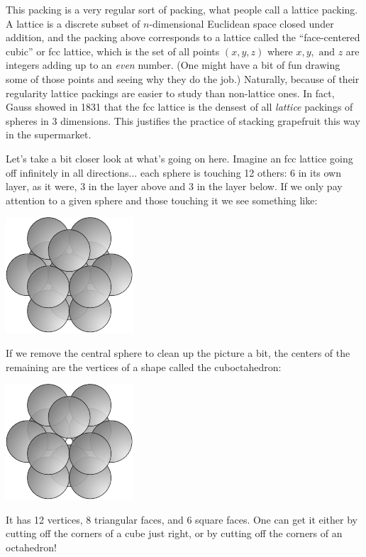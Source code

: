 This packing is a very regular sort of packing, what people call a lattice packing. A lattice is a discrete subset of $n$-dimensional Euclidean space closed under addition, and the packing above corresponds to a lattice called the ``face-centered cubic'' or fcc lattice, which is the set of all points $(x,y,z)$ where $x, y,\text{ and }z$ are integers adding up to an \emph{even} number. (One might have a bit of fun drawing some of those points and seeing why they do the job.) Naturally, because of their regularity lattice packings are easier to study than non-lattice ones. In fact, Gauss showed in 1831 that the fcc lattice is the densest of all \emph{lattice} packings of spheres in 3 dimensions. This justifies the practice of stacking grapefruit this way in the supermarket.

Let's take a bit closer look at what's going on here. Imagine an fcc lattice going off infinitely in all directions... each sphere is touching 12 others: 6 in its own layer, as it were, 3 in the layer above and 3 in the layer below. If we only pay attention to a given sphere and those touching it we see something like:
\begin{center}
\includegraphics[]{figures/wk20_fig4.pdf}
\end{center}
If we remove the central sphere to clean up the picture a bit, the centers of the remaining are the vertices of a shape called the cuboctahedron:
\begin{center}
\includegraphics[]{figures/wk20_fig5.pdf}
\end{center}
It has 12 vertices, 8 triangular faces, and 6 square faces. One can get it either by cutting off the corners of a cube just right, or by cutting off the corners of an octahedron!

